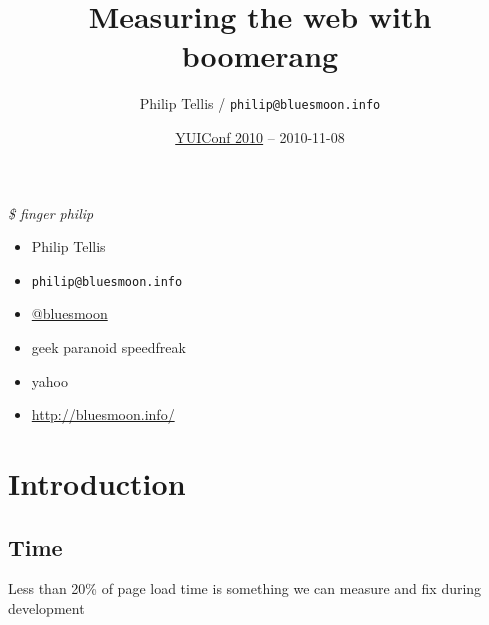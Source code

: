 \documentclass{beamer}
\author{Philip Tellis / \texttt{philip@bluesmoon.info}}
\title{Measuring the web with boomerang}
\date{\href{http://yuilibrary.com/yuiconf2010/}{YUIConf 2010} -- 2010-11-08}
\begin{document}
\begin{frame}
  \titlepage
\end{frame}


\begin{frame}{\textit{\$ finger philip}}
  \begin{itemize}
  \item Philip Tellis
  \item \small{\texttt{philip@bluesmoon.info}}
  \item \href{http://twitter.com/bluesmoon}{@bluesmoon}
  \item geek \bullet paranoid \bullet speedfreak
  \item yahoo
  \item \href{http://bluesmoon.info/}{http://bluesmoon.info/}
  \end{itemize}
\end{frame}


\section{Introduction}
\label{sec:intro}

\subsection{Time}

\begin{frame}{}
\end{frame}

\begin{frame}{}
\end{frame}

\begin{frame}{}
\end{frame}

\begin{frame}{}
  \begin{center}
  Less than 20\% of page load time is something we can measure and fix during development
  \end{center}
\end{frame}
\end{document}
